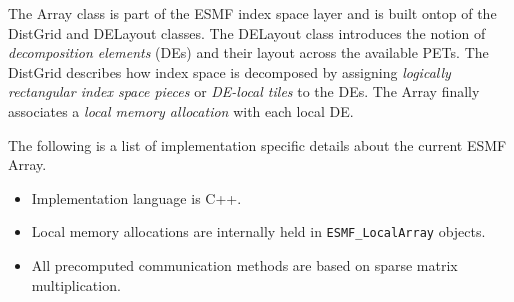 

The Array class is part of the ESMF index space layer and is built ontop of the DistGrid and DELayout classes. The DELayout class introduces the notion of 
{\em decomposition elements} (DEs) and their layout across the available PETs. The DistGrid describes how index space is decomposed by assigning {\em logically rectangular index space pieces} or {\em DE-local tiles} to the DEs. The Array finally associates a {\em local memory allocation} with each local DE.

The following is a list of implementation specific details about the current ESMF Array.

\begin{itemize}
\item Implementation language is C++.
\item Local memory allocations are internally held in {\tt ESMF\_LocalArray}
objects.
\item All precomputed communication methods are based on sparse matrix
multiplication.
\end{itemize}
